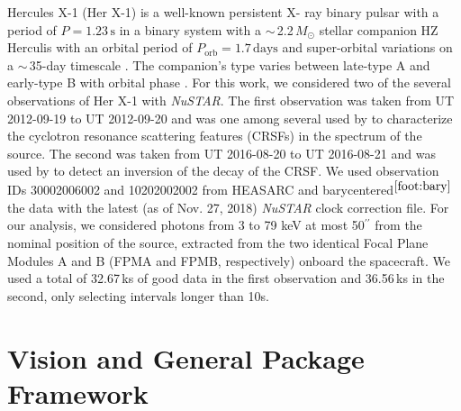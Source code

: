 \documentclass[twocolumn]{aastex62}
\newcommand{\project}[1]{\textsl{#1}\xspace}
\newcommand{\nustar}{\project{NuSTAR}\xspace}
\newcommand{\Msun}{\ensuremath{M_\odot}\xspace}
\begin{document}
Hercules X-1 (Her X-1) is a well-known persistent X- ray binary pulsar with a period of $P = 1.23\,\mathrm{s}$ \citep{tananbaum1972} in a binary system with a $\sim$\,2.2\,$\Msun$ stellar companion HZ Herculis \citep{davidsen1972,forman1972,bahcall1972,reynolds1997,leahy2014} with an orbital period of $P_\mathrm{orb}=1.7\,\mathrm{days}$ and super-orbital variations on a $\sim$\,35-day timescale \citep{giacconi1973,scott1999,igna2011}. 
The companion's type varies between late-type A and early-type B with orbital phase \citep{anderson1994,cheng1995}. 
For this work, we considered two of the several observations of Her X-1 with \nustar. 
The first observation was taken from UT 2012-09-19 to UT 2012-09-20 and was one among several used by \citet{Fuerst13} to characterize the cyclotron resonance scattering features (CRSFs) in the spectrum of the source. 
The second was taken from UT 2016-08-20 to UT 2016-08-21 and was used by \citet{staubert_2017} to detect an inversion of the decay of the CRSF. 
We used observation IDs 30002006002 and 10202002002 from HEASARC and barycentered$^{\ref{foot:bary}}$ the data with the latest (as of Nov. 27, 2018) \nustar clock correction file.
For our analysis, we considered photons from 3 to 79 keV at most 50$^{\prime\prime}$ from the nominal position of the source, extracted from the two identical Focal Plane Modules A and B (FPMA and FPMB, respectively) onboard the spacecraft. 
We used a total of 32.67\,ks of good data in the first observation and 36.56\,ks in the second, only selecting intervals longer than 10s.



\section{Vision and General Package Framework}
\label{sec:vision}
\end{document}
